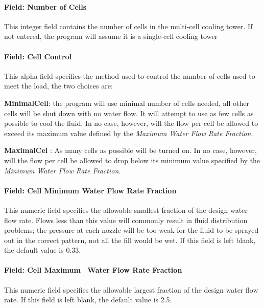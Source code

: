 \paragraph{Field: Number of Cells}\label{field-number-of-cells-3}

This integer field contains the number of cells in the multi-cell cooling tower. If not entered, the program will assume it is a single-cell cooling tower

\paragraph{Field: Cell Control}\label{field-cell-control-3}

This alpha field specifies the method used to control the number of cells used to meet the load, the two choices are:

\textbf{MinimalCell}: the program will use minimal number of cells needed, all other cells will be shut down with no water flow. It will attempt to use as few cells as possible to cool the fluid. In no case, however, will the flow per cell be allowed to exceed its maximum value defined by the \emph{Maximum Water Flow Rate Fraction.}

\textbf{MaximalCel} : As many cells as possible will be turned on. In no case, however, will the flow per cell be allowed to drop below its minimum value specified by the \emph{Minimum Water Flow Rate Fraction}.

\paragraph{Field: Cell Minimum Water Flow Rate Fraction}\label{field-cell-minimum-water-flow-rate-fraction-3}

This numeric field specifies the allowable smallest fraction of the design water flow rate. Flows less than this value will commonly result in fluid distribution problems; the pressure at each nozzle will be too weak for the fluid to be sprayed out in the correct pattern, not all the fill would be wet. If this field is left blank, the default value is 0.33.

\paragraph{Field: Cell Maximum~ Water Flow Rate Fraction}\label{field-cell-maximum-water-flow-rate-fraction-3}

This numeric field specifies the allowable largest fraction of the design water flow rate. If this field is left blank, the default value is 2.5.

